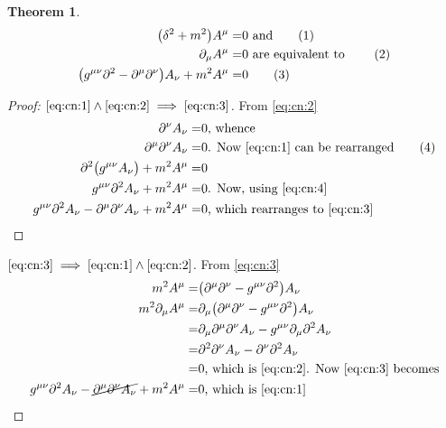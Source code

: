 \documentclass[]{article}
\newcommand\numberthis{\addtocounter{equation}{1}\tag{\theequation}}
\newtheorem{thm}{Theorem}
\begin{document}
\begin{thm}
	\begin{align*}
		\big(\delta^2+m^2\big) A^{\mu}=&0 \text{ and} \numberthis \label{eq:cn:1}\\
		 \partial_{\mu} A^{\mu}=&0 \text{ are equivalent to } \numberthis \label{eq:cn:2}\\
		 \big(g^{\mu\nu}\partial^2-\partial^\mu\partial^\nu\big)A_\nu + m^2 A^\mu=&0 \numberthis \label{eq:cn:3}
	\end{align*}
\end{thm}
\begin{proof}[Proof: $\eqref{eq:cn:1} \land \eqref{eq:cn:2} \implies \eqref{eq:cn:3}$]
	 From	\eqref{eq:cn:2} 
	\begin{align*}
		 \partial^\nu A_\nu =& 0 \text{, whence}\\
		 \partial^\mu \partial^\nu A_\nu =& 0 \text{. Now \eqref{eq:cn:1} can be rearranged} \numberthis \label{eq:cn:4}\\
		 \partial^2 \big(g^{\mu\nu}A_\nu\big) + m^2 A^\mu =&0\\
		 g^{\mu\nu} \partial^2 A_\nu + m^2 A^\mu =&0 \text{. Now, using \eqref{eq:cn:4}}\\
		 g^{\mu\nu} \partial^2 A_\nu - \partial^\mu \partial^\nu A_\nu + m^2 A^\mu =&0 \text{, which rearranges to \eqref{eq:cn:3}}
	\end{align*}
\end{proof}
\begin{proof}[$\eqref{eq:cn:3} \implies \eqref{eq:cn:1} \land \eqref{eq:cn:2}$]
	From \eqref{eq:cn:3}
	\begin{align*}
	 	m^2 A^\mu=&\big(\partial^\mu\partial^\nu-g^{\mu\nu}\partial^2\big)A_\nu \\
	 	m^2 \partial_\mu A^\mu =&\partial_\mu \big(\partial^\mu\partial^\nu-g^{\mu\nu}\partial^2\big)A_\nu\\
	 	=&\partial_\mu\partial^\mu\partial^\nu A_\nu -  g^{\mu\nu}\partial_\mu\partial^2A_\nu\\
	 	=&\partial^2\partial^\nu A_\nu - \partial^\nu\partial^2A_\nu\\
	 	=& 0 \text{, which is \eqref{eq:cn:2}. Now \eqref{eq:cn:3} becomes}\\
	 	g^{\mu\nu}\partial^2 A_\nu-\cancel{\partial^\mu\partial^\nu A_\nu} + m^2 A^\mu=&0 \text{, which is \eqref{eq:cn:1}}
	\end{align*}
\end{proof}

\raggedright

\end{document}

